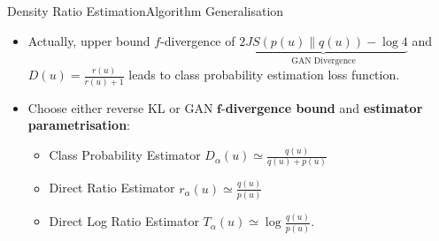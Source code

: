 \documentclass[handout]{beamer}
\newcommand{\E}{\mathbb{E}}
\begin{document}
\begin{frame}{Density Ratio Estimation}{Algorithm Generalisation}
\begin{itemize}
\item Actually, upper bound $f$-divergence of $\underbrace{2JS(p(u)\|q(u))-\log 4}_\text{GAN Divergence}$ and $D(u)=\frac{r(u)}{r(u)+1}$ leads to class probability estimation loss function.
\vspace{0.5cm}
\item Choose either reverse KL or GAN $\bm{f}$-\textbf{divergence bound} and \textbf{estimator parametrisation}:
\begin{itemize}
\item Class Probability Estimator $D_\alpha(u)\simeq \frac{q(u)}{q(u)+p(u)}$
\item Direct Ratio Estimator $r_\alpha(u)\simeq \frac{q(u)}{p(u)}$
\item Direct Log Ratio Estimator $T_\alpha(u)\simeq\log \frac{q(u)}{p(u)}$.
\end{itemize}
\end{itemize}
\end{frame}
\end{document}
